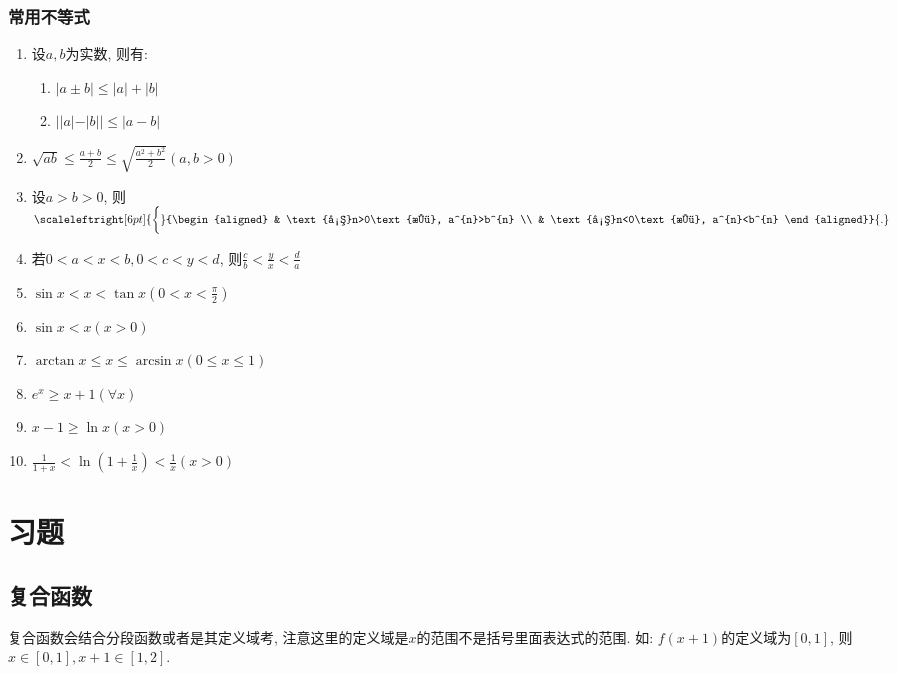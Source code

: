 \subsubsection{常用不等式}
\begin{enumerate}
    \item 设$ a,b $为实数, 则有:
          \begin{enumerate}
              \item $ |a\pm b|\le |a|+|b| $
              \item $ ||a|-|b||\le |a-b| $
          \end{enumerate}
    \item $ \sqrt{ab}\le \frac{a+b}{2}\le \sqrt{\frac{a^{2}+b^{2}}{2}}(a,b>0) $
    \item 设$ a>b>0 $, 则$ \scaleleftright[6pt]{\biggl\{}{\begin{aligned}
                       & \text{当}n>0\text{时}, a^{n}>b^{n} \\
                       & \text{当}n<0\text{时}, a^{n}<b^{n}
                  \end{aligned}}{.} $
    \item 若$ 0<a<x<b,0<c<y<d $, 则$ \frac{c}{b}<\frac{y}{x}<\frac{d}{a} $
    \item $ \sin x<x<\tan x(0<x<\frac{\pi}{2}) $
    \item $ \sin x<x(x>0) $
    \item $ \arctan x\le x\le \arcsin x(0\le x\le 1)$
    \item $ e^{x}\ge x+1(\forall x) $
    \item $ x-1\ge \ln x(x>0) $
    \item $ \frac{1}{1+x}<\ln (1+\frac{1}{x})<\frac{1}{x}(x>0) $
\end{enumerate}
\section{习题}
\subsection{复合函数}
复合函数会结合分段函数或者是其定义域考, 注意这里的定义域是$ x $的范围不是括号里面表达式的范围. 如: $ f(x+1) $的定义域为$ [0,1] $, 则$ x\in [0,1], x+1\in [1,2] $.
